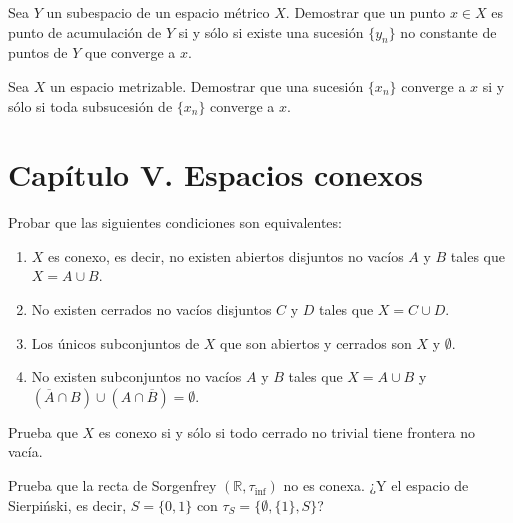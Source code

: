 \begin{ejer}[127]
Sea $Y$ un subespacio de un espacio métrico $X$. Demostrar que un punto $x \in X$ es punto de acumulación de $Y$ si y sólo si existe una sucesión $\{y_n\}$ no constante de puntos de $Y$ que converge a $x$.
\end{ejer}

\begin{ejer}[128]
Sea $X$ un espacio metrizable. Demostrar que una sucesión $\{x_n\}$ converge a $x$ si y sólo si toda subsucesión de $\{x_n\}$ converge a $x$.
\end{ejer}

\section*{Capítulo V. Espacios conexos}

\begin{ejer}[129]
Probar que las siguientes condiciones son equivalentes:
\begin{enumerate}
    \item[a)] $X$ es conexo, es decir, no existen abiertos disjuntos no vacíos $A$ y $B$ tales que $X = A \cup B$.
    \item[b)] No existen cerrados no vacíos disjuntos $C$ y $D$ tales que $X = C \cup D$.
    \item[c)] Los únicos subconjuntos de $X$ que son abiertos y cerrados son $X$ y $\emptyset$.
    \item[d)] No existen subconjuntos no vacíos $A$ y $B$ tales que $X = A \cup B$ y $(\overline{A} \cap B) \cup (A \cap \overline{B}) = \emptyset$.
\end{enumerate}
\end{ejer}

\begin{ejer}[130]
Prueba que $X$ es conexo si y sólo si todo cerrado no trivial tiene frontera no vacía.
\end{ejer}

\begin{ejer}[131]
Prueba que la recta de Sorgenfrey $(\mathbb{R}, \tau_{\mathrm{inf}})$ no es conexa. ¿Y el espacio de Sierpiński, es decir, $S = \{0,1\}$ con $\tau_S = \{\emptyset, \{1\}, S\}$?
\end{ejer}

